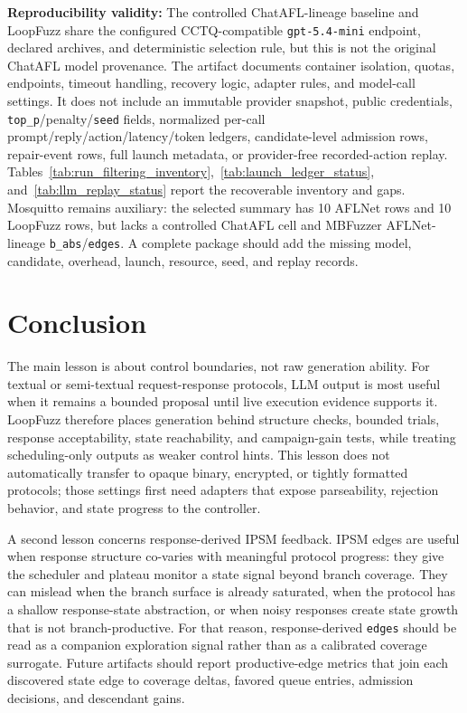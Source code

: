\documentclass[final,5p,times,number]{elsarticle}
\begin{document}
\textbf{Reproducibility validity:} The controlled ChatAFL-lineage baseline and LoopFuzz share the configured CCTQ-compatible \texttt{gpt-5.4-mini} endpoint, declared archives, and deterministic selection rule, but this is not the original ChatAFL model provenance. The artifact documents container isolation, quotas, endpoints, timeout handling, recovery logic, adapter rules, and model-call settings. It does not include an immutable provider snapshot, public credentials, \texttt{top\_p}/penalty/\texttt{seed} fields, normalized per-call prompt/reply/action/latency/token ledgers, candidate-level admission rows, repair-event rows, full launch metadata, or provider-free recorded-action replay. Tables~\ref{tab:run_filtering_inventory},~\ref{tab:launch_ledger_status}, and~\ref{tab:llm_replay_status} report the recoverable inventory and gaps. Mosquitto remains auxiliary: the selected summary has 10 AFLNet rows and 10 LoopFuzz rows, but lacks a controlled ChatAFL cell and MBFuzzer AFLNet-lineage \texttt{b\_abs}/\texttt{edges}. A complete package should add the missing model, candidate, overhead, launch, resource, seed, and replay records.

\section{Conclusion}
The main lesson is about control boundaries, not raw generation ability. For textual or semi-textual request-response protocols, LLM output is most useful when it remains a bounded proposal until live execution evidence supports it. LoopFuzz therefore places generation behind structure checks, bounded trials, response acceptability, state reachability, and campaign-gain tests, while treating scheduling-only outputs as weaker control hints. This lesson does not automatically transfer to opaque binary, encrypted, or tightly formatted protocols; those settings first need adapters that expose parseability, rejection behavior, and state progress to the controller.

A second lesson concerns response-derived IPSM feedback. IPSM edges are useful when response structure co-varies with meaningful protocol progress: they give the scheduler and plateau monitor a state signal beyond branch coverage. They can mislead when the branch surface is already saturated, when the protocol has a shallow response-state abstraction, or when noisy responses create state growth that is not branch-productive. For that reason, response-derived \texttt{edges} should be read as a companion exploration signal rather than as a calibrated coverage surrogate. Future artifacts should report productive-edge metrics that join each discovered state edge to coverage deltas, favored queue entries, admission decisions, and descendant gains.
\end{document}
